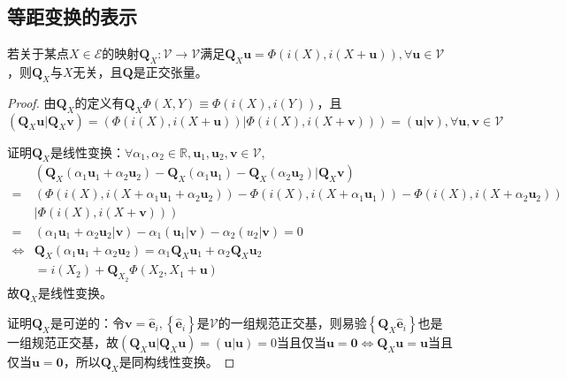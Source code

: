 \documentclass[main.tex]{subfiles}
\begin{document}
\subsection{等距变换的表示}
\begin{lemma}
若关于某点$X\in\mathcal{E}$的映射$\mathbf{Q}_X:\mathcal{V}\rightarrow\mathcal{V}$满足$\mathbf{Q}_X\mathbf{u}=\Phi\left(i\left(X\right),i\left(X+\mathbf{u}\right)\right),\forall\mathbf{u}\in\mathcal{V}$，则$\mathbf{Q}_X$与$X$无关，且$\mathbf{Q}$是正交张量。
\end{lemma}
\begin{proof}
由$\mathbf{Q}_X$的定义有$\mathbf{Q}_X\Phi\left(X,Y\right)\equiv\Phi\left(i\left(X\right),i\left(Y\right)\right)$，且
\[
\left(\mathbf{Q}_X\mathbf{u}|\mathbf{Q}_X\mathbf{v}\right)=\left(\Phi\left(i\left(X\right),i\left(X+\mathbf{u}\right)\right)|\Phi\left(i\left(X\right),i\left(X+\mathbf{v}\right)\right)\right)=\left(\mathbf{u}|\mathbf{v}\right),\forall\mathbf{u},\mathbf{v}\in\mathcal{V}
\]

证明$\mathbf{Q}_X$是线性变换：$\forall \alpha_1,\alpha_2\in\mathbb{R},\mathbf{u}_1,\mathbf{u}_2,\mathbf{v}\in\mathcal{V}$,
\begin{align*}
    &\left(\mathbf{Q}_X\left(\alpha_1\mathbf{u}_1+\alpha_2\mathbf{u}_2\right)-\mathbf{Q}_X\left(\alpha_1\mathbf{u}_1\right)-\mathbf{Q}_X\left(\alpha_2\mathbf{u}_2\right)|\mathbf{Q}_X\mathbf{v}\right)\\
    =&\left(\Phi\left(i\left(X\right),i\left(X+\alpha_1\mathbf{u}_1+\alpha_2\mathbf{u}_2\right)\right)-\Phi\left(i\left(X\right),i\left(X+\alpha_1\mathbf{u}_1\right)\right)-\Phi\left(i\left(X\right),i\left(X+\alpha_2\mathbf{u}_2\right)\right)\right.\\
    &\left.|\Phi\left(i\left(X\right),i\left(X+\mathbf{v}\right)\right)\right)\\
    =&\left(\alpha_1\mathbf{u}_1+\alpha_2\mathbf{u}_2|\mathbf{v}\right)-\alpha_1\left(\mathbf{u}_1|\mathbf{v}\right)-\alpha_2\left(u_2|\mathbf{v}\right)=0\\
    \Leftrightarrow&\mathbf{Q}_X\left(\alpha_1\mathbf{u}_1+\alpha_2\mathbf{u}_2\right)=\alpha_1\mathbf{Q}_X\mathbf{u}_1+\alpha_2\mathbf{Q}_X\mathbf{u}_2\\
    &=i\left(X_2\right)+\mathbf{Q}_{X_2}\Phi\left(X_2,X_1+\mathbf{u}\right)
\end{align*}
故$\mathbf{Q}_X$是线性变换。

证明$\mathbf{Q}_X$是可逆的：令$\mathbf{v}=\mathbf{\hat{e}}_i,\left\{\mathbf{\hat{e}}_i\right\}$是$\mathcal{V}$的一组规范正交基，则易验$\left\{\mathbf{Q}_X\mathbf{\hat{e}}_i\right\}$也是一组规范正交基，故$\left(\mathbf{Q}_X\mathbf{u}|\mathbf{Q}_X\mathbf{u}\right)=\left(\mathbf{u}|\mathbf{u}\right)=0$当且仅当$\mathbf{u}=\mathbf{0}\Leftrightarrow\mathbf{Q}_X\mathbf{u}=\mathbf{u}$当且仅当$\mathbf{u}=\mathbf{0}$，所以$\mathbf{Q}_X$是同构线性变换。


\end{proof}
\end{document}
